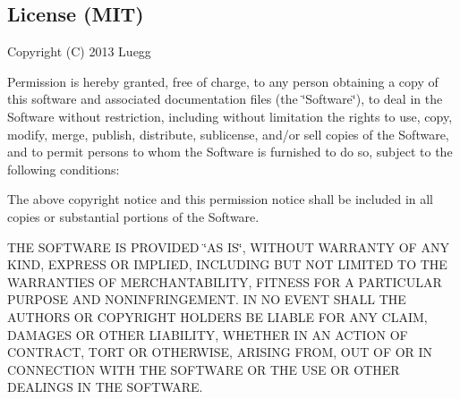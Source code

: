 \subsection*{License (M\+I\+T)}

Copyright (C) 2013 Luegg

Permission is hereby granted, free of charge, to any person obtaining a copy of this software and associated documentation files (the \char`\"{}\+Software\char`\"{}), to deal in the Software without restriction, including without limitation the rights to use, copy, modify, merge, publish, distribute, sublicense, and/or sell copies of the Software, and to permit persons to whom the Software is furnished to do so, subject to the following conditions\+:

The above copyright notice and this permission notice shall be included in all copies or substantial portions of the Software.

T\+H\+E S\+O\+F\+T\+W\+A\+R\+E I\+S P\+R\+O\+V\+I\+D\+E\+D \char`\"{}\+A\+S I\+S\char`\"{}, W\+I\+T\+H\+O\+U\+T W\+A\+R\+R\+A\+N\+T\+Y O\+F A\+N\+Y K\+I\+N\+D, E\+X\+P\+R\+E\+S\+S O\+R I\+M\+P\+L\+I\+E\+D, I\+N\+C\+L\+U\+D\+I\+N\+G B\+U\+T N\+O\+T L\+I\+M\+I\+T\+E\+D T\+O T\+H\+E W\+A\+R\+R\+A\+N\+T\+I\+E\+S O\+F M\+E\+R\+C\+H\+A\+N\+T\+A\+B\+I\+L\+I\+T\+Y, F\+I\+T\+N\+E\+S\+S F\+O\+R A P\+A\+R\+T\+I\+C\+U\+L\+A\+R P\+U\+R\+P\+O\+S\+E A\+N\+D N\+O\+N\+I\+N\+F\+R\+I\+N\+G\+E\+M\+E\+N\+T. I\+N N\+O E\+V\+E\+N\+T S\+H\+A\+L\+L T\+H\+E A\+U\+T\+H\+O\+R\+S O\+R C\+O\+P\+Y\+R\+I\+G\+H\+T H\+O\+L\+D\+E\+R\+S B\+E L\+I\+A\+B\+L\+E F\+O\+R A\+N\+Y C\+L\+A\+I\+M, D\+A\+M\+A\+G\+E\+S O\+R O\+T\+H\+E\+R L\+I\+A\+B\+I\+L\+I\+T\+Y, W\+H\+E\+T\+H\+E\+R I\+N A\+N A\+C\+T\+I\+O\+N O\+F C\+O\+N\+T\+R\+A\+C\+T, T\+O\+R\+T O\+R O\+T\+H\+E\+R\+W\+I\+S\+E, A\+R\+I\+S\+I\+N\+G F\+R\+O\+M, O\+U\+T O\+F O\+R I\+N C\+O\+N\+N\+E\+C\+T\+I\+O\+N W\+I\+T\+H T\+H\+E S\+O\+F\+T\+W\+A\+R\+E O\+R T\+H\+E U\+S\+E O\+R O\+T\+H\+E\+R D\+E\+A\+L\+I\+N\+G\+S I\+N T\+H\+E S\+O\+F\+T\+W\+A\+R\+E. 